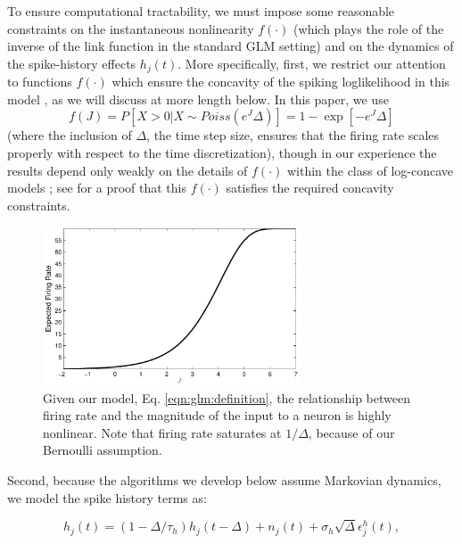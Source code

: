 To ensure computational tractability, we must impose some reasonable constraints on the instantaneous nonlinearity $f(\cdot)$ (which plays the role of the inverse of the link function in the standard GLM setting) and on the dynamics of the spike-history effects $h_j(t)$. More specifically, first, we restrict our attention to functions $f(\cdot)$ which ensure the concavity of the spiking loglikelihood in this model \cite{PAN04c}, as we will discuss at more length below. In this paper, we use \begin{equation} f(J) = P[X>0 | X \sim Poiss(e^J \Delta)] = 1 - \exp[-e^J \Delta] \end{equation} (where the inclusion of $\Delta$, the time step size, ensures that the firing rate scales properly with respect to the time discretization), though in our experience the results depend only weakly on the details of $f(\cdot)$ within the class of log-concave models \cite{LD89,PAN04c}; see \cite{Escola07} for a proof that this $f(\cdot)$ satisfies the required concavity constraints.

\begin{figure}[h]
\centering
\includegraphics[width=3in]{../figs/fr_vs_J}
\caption{Given our model, Eq. \ref{eqn:glm:definition}, the relationship between firing rate and the magnitude of the input to a neuron is highly nonlinear.  Note that firing rate saturates at $1/\Delta$, because of our Bernoulli assumption.}
\label{fig:egfluor}
\end{figure}

Second, because the algorithms we develop below assume Markovian dynamics, we model the spike history terms as: 

\begin{equation} \label{eqn:h:definition} h_j(t) = (1- \Delta/\tau_h) h_j(t- \Delta) +n_j(t) + \sigma_h \sqrt{\Delta} \epsilon^h_j(t), \end{equation} 
	
